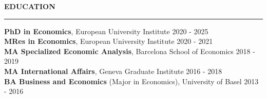 \documentclass[letterpaper,11pt]{article}
\begin{document}
\vspace{0.5cm}
\textbf{EDUCATION}\\
\vspace{1mm} \hrule
\vspace{2mm}
\hspace{0.9cm} \textbf{PhD in Economics}, European University Institute \hfill 2020 - 2025\\ \vspace{1mm}
\hspace{0.9cm} \textbf{MRes in Economics}, European University Institute \hfill 2020 - 2021\\ \vspace{1mm}
\hspace{0.9cm} \textbf{MA Specialized Economic Analysis}, Barcelona School of Economics \hfill{2018 - 2019}\\  \vspace{1mm}
\hspace{0.9cm} \textbf{MA International Affairs}, Geneva Graduate Institute \hfill{2016 - 2018}\\ \vspace{1mm}
\hspace{0.9cm} \textbf{BA Business and Economics} (Major in Economics), University of Basel \hfill{2013 - 2016}\\ 
\end{document}
